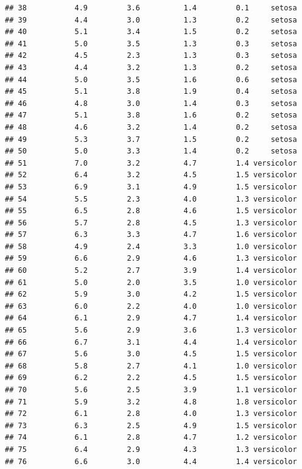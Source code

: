 \documentclass[
]{book}
\begin{document}
\begin{verbatim}
## 38           4.9         3.6          1.4         0.1     setosa
## 39           4.4         3.0          1.3         0.2     setosa
## 40           5.1         3.4          1.5         0.2     setosa
## 41           5.0         3.5          1.3         0.3     setosa
## 42           4.5         2.3          1.3         0.3     setosa
## 43           4.4         3.2          1.3         0.2     setosa
## 44           5.0         3.5          1.6         0.6     setosa
## 45           5.1         3.8          1.9         0.4     setosa
## 46           4.8         3.0          1.4         0.3     setosa
## 47           5.1         3.8          1.6         0.2     setosa
## 48           4.6         3.2          1.4         0.2     setosa
## 49           5.3         3.7          1.5         0.2     setosa
## 50           5.0         3.3          1.4         0.2     setosa
## 51           7.0         3.2          4.7         1.4 versicolor
## 52           6.4         3.2          4.5         1.5 versicolor
## 53           6.9         3.1          4.9         1.5 versicolor
## 54           5.5         2.3          4.0         1.3 versicolor
## 55           6.5         2.8          4.6         1.5 versicolor
## 56           5.7         2.8          4.5         1.3 versicolor
## 57           6.3         3.3          4.7         1.6 versicolor
## 58           4.9         2.4          3.3         1.0 versicolor
## 59           6.6         2.9          4.6         1.3 versicolor
## 60           5.2         2.7          3.9         1.4 versicolor
## 61           5.0         2.0          3.5         1.0 versicolor
## 62           5.9         3.0          4.2         1.5 versicolor
## 63           6.0         2.2          4.0         1.0 versicolor
## 64           6.1         2.9          4.7         1.4 versicolor
## 65           5.6         2.9          3.6         1.3 versicolor
## 66           6.7         3.1          4.4         1.4 versicolor
## 67           5.6         3.0          4.5         1.5 versicolor
## 68           5.8         2.7          4.1         1.0 versicolor
## 69           6.2         2.2          4.5         1.5 versicolor
## 70           5.6         2.5          3.9         1.1 versicolor
## 71           5.9         3.2          4.8         1.8 versicolor
## 72           6.1         2.8          4.0         1.3 versicolor
## 73           6.3         2.5          4.9         1.5 versicolor
## 74           6.1         2.8          4.7         1.2 versicolor
## 75           6.4         2.9          4.3         1.3 versicolor
## 76           6.6         3.0          4.4         1.4 versicolor

\end{verbatim}
\end{document}
